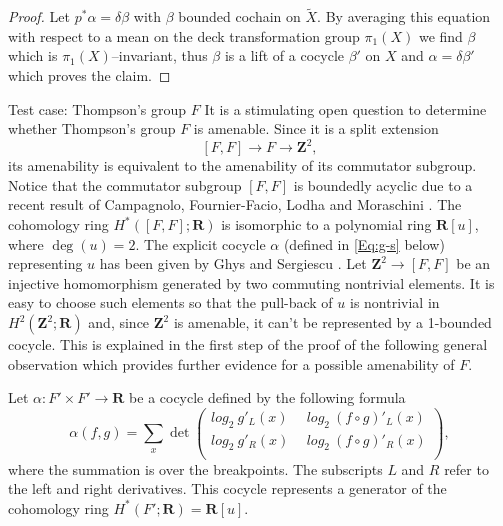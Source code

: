 \documentclass[12pt,reqno,a4paper]{amsart}
\makeatletter
\def\section{\@startsection{section}{1}%
  \z@{.7\linespacing\@plus\linespacing}{.5\linespacing}%
  {\normalfont\bfseries\raggedright\boldmath}}
\theoremstyle{definition}
\theoremstyle{remark}
\numberwithin{equation}{section}
\numberwithin{figure}{section}
\newcommand{\B}[1]{{\mathbf #1}}
\makeatother
\begin{document}
\begin{proof}
Let $p^*\alpha=\delta \beta$ with $\beta$ bounded cochain on $\widetilde X$.
By averaging this equation with respect to a mean on the deck transformation
group $\pi_1(X)$ we find $\beta$ which is $\pi_1(X)$--invariant, thus
$\beta$ is a lift of a cocycle $\beta'$ on $X$ and $\alpha=\delta\beta'$
which proves the claim.
\end{proof}


\section{Test case: Thompson's group $F$}\label{S:test}
It is a stimulating open question to determine whether Thompson's group $F$ is
amenable. Since it is a split extension 
$$
[F,F]\to F\to \B Z^2,
$$
its amenability is equivalent to the amenability of its commutator subgroup.
Notice that the commutator subgroup $[F,F]$ is boundedly acyclic due to
a recent result of Campagnolo, Fournier-Facio, Lodha and Moraschini
\cite[Corollary 1.14]{2311.16259}.
The cohomology ring $H^*([F,F];\B R)$ is isomorphic to a polynomial ring $\B R[u]$, where $\deg(u)=2$.
The explicit cocycle $\alpha$ (defined in \eqref{Eq:g-s} below) 
representing $u$ has been given by Ghys and Sergiescu
\cite[Corollaire~4.5]{zbMATH04056610}.
Let $\B Z^2\to [F,F]$ be an injective
homomorphism generated by two commuting nontrivial elements.
It is easy to choose such elements so that the pull-back of $u$ is nontrivial
in $H^2(\B Z^2;\B R)$ and, since $\B Z^2$ is amenable, it can't be represented
by a 1-bounded cocycle. This is explained in the first step of the proof of the
following general observation
which provides further evidence for a possible amenability of $F$.

Let $\alpha \colon F'\times F'\to \B R$ be a cocycle defined by the
following formula
\begin{equation}
\alpha(f,g) = \sum_x \det
\left( 
\begin{smallmatrix}
log_2\ g'_L(x)\ &\ log_2\ (f\circ g)'_L(x)\\
log_2\ g'_R(x)\ &\ log_2\ (f\circ g)'_R(x)\\
\end{smallmatrix}
 \right),
\label{Eq:g-s}
\end{equation}
where the summation is over the breakpoints. The subscripts $L$ and $R$
refer to the left and right derivatives. This cocycle represents
a generator of the cohomology ring $H^*(F';\B R)=\B R[u]$.
\end{document}
